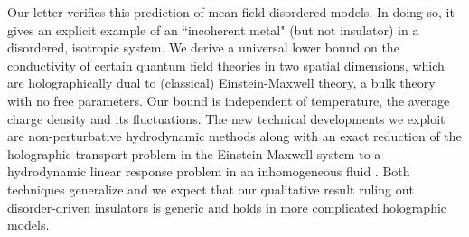 \documentclass[10pt, oneside]{book}
\begin{document}
\begin{doublespace}
Our letter verifies this  prediction of mean-field disordered models. In doing so, it gives an explicit example of an ``incoherent metal" (but not insulator) in a disordered, isotropic system.   We derive a universal lower bound on the conductivity of certain quantum field theories in two spatial dimensions, which are holographically dual to (classical) Einstein-Maxwell theory, a bulk theory with no free parameters.  Our bound is independent of temperature, the average charge density and its fluctuations.   The new technical developments we exploit are non-perturbative hydrodynamic methods \cite{Lucas:2015lna} along with an exact reduction of the holographic transport problem in the Einstein-Maxwell system to a hydrodynamic linear response problem in an inhomogeneous fluid \cite{Donos:2015gia}.  Both techniques generalize and we expect that our qualitative result ruling out disorder-driven insulators is generic and holds in more complicated holographic models.


\end{doublespace}
\end{document}
